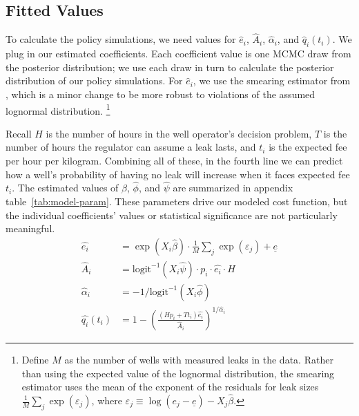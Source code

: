 \documentclass[12pt,oneside,letterpaper]{article}
\theoremstyle{definition}
\begin{document}
\begin{refsection}
\subsection{Fitted Values}
\label{sec:fitted-values}

To calculate the policy simulations, we need values for \(\hat{e}_i\), \(\hat{A}_i\), \(\hat{\alpha}_i\), and \(\hat{q}_i(t_i)\).
We plug in our estimated coefficients.
Each coefficient value is one \gls{MCMC} draw from the posterior distribution; we use each draw in turn to calculate the posterior distribution of our policy simulations.
For \(\hat{e}_i\), we use the smearing estimator from \textcite{Manning/Duan/Rogers:1987}, which is a minor change to be more robust to violations of the assumed lognormal distribution.%
\footnote{%
Define \(M\) as the number of wells with measured leaks in the data.
Rather than using the expected value of the lognormal distribution, the smearing estimator uses the mean of the exponent of the residuals for leak sizes
\(\frac{1}{M} \sum_j \exp(\varepsilon_j)\), where
\(\varepsilon_j \equiv \log(e_j - \underline{e}) - X_j \hat{\beta}\).
}

Recall \(H\) is the number of hours in the well operator's decision problem, \(T\) is the number of hours the regulator can assume a leak lasts, and \(t_i\) is the expected fee per hour per kilogram.
Combining all of these, in the fourth line we can predict how a well's probability of having no leak will increase when it faces expected fee \(t_i\).
The estimated values of \(\hat{\beta}\), \(\hat{\phi}\), and \(\hat{\psi}\) are summarized in appendix table~\ref{tab:model-param}.
These parameters drive our modeled cost function, but the individual coefficients' values or statistical significance are not particularly meaningful.
\begin{align}
\hat{e_i} &= \exp( X_i \hat{\beta}) \cdot \frac{1}{M}\sum_j \exp(\varepsilon_j) + \underline{e} \nonumber \\
\hat{A}_i &= \text{logit}^{-1}(X_i \hat{\psi}) \cdot p_i \cdot \hat{e_i} \cdot H \nonumber \\
\hat{\alpha}_i &= -1 / \text{logit}^{-1}(X_i \hat{\phi}) \label{eqn:alpha-fitted} \\
\hat{q_i}(t_i) &= 1 - \left(\frac{(H p_i + T t_i) \hat{e_i}}{\hat{A}_i}\right) ^{1 / \hat{\alpha}_i} \nonumber
\end{align}


\end{refsection}
\end{document}
